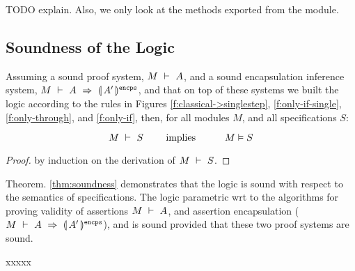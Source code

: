 TODO explain. Also, we only look at the methods exported from the module.


\subsection{Soundness of the \SpecLang Logic}

\label{s:soundness}

\begin{theorem}[Soundness]
\label{thm:soundness}
Assuming a sound \SpecO proof system, $M\ \vdash\ A$, and
a sound encapsulation inference system, $M\ \vdash\ A\ \Rightarrow\ \llparenthesis\, A'\, \rrparenthesis^{\texttt{encps}}$,
 and  that on top of these systems we built
 the \SpecLang logic according to the rules in Figures \ref{f:classical->singlestep},  \ref{f:only-if-single}, 
 \ref{f:only-through},  and \ref{f:only-if},   then, for    all modules $M$, and all \SpecLang specifications  $S$:
 
 $$\proves{M}{S}\ \ \ \ \ \ \ \mbox{implies}\ \ \ \ \ \  \ \ \ \satisfies{M}{S}$$
\end{theorem}

\begin{proof}
by induction on the derivation of $M\ \vdash\ S$.
\end{proof}

Theorem. \ref{thm:soundness} demonstrates 
 that the   \SpecLang logic is sound with respect to the semantics of \SpecLang specifications.
 The \SpecLang logic parametric wrt to the algorithms for proving validity of assertions
 $M\ \vdash\ A$, and 
 assertion encapsulation ($M\ \vdash\ A\ \Rightarrow\ \llparenthesis\, A'\, \rrparenthesis^{\texttt{encps}}$), and is sound
 provided that these two proof systems are sound.


 xxxxx
